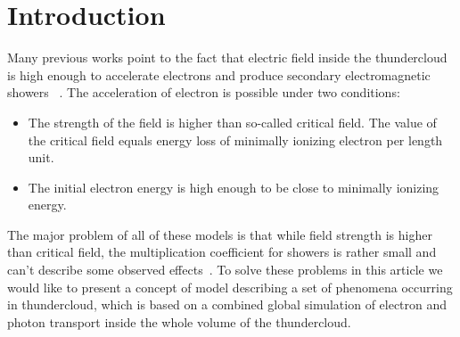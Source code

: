 \documentclass[%
 aip,
cp,  %
 amsmath,amssymb,%
 reprint,%
]{revtex4-2}
\begin{document}
\section{Introduction}
Many previous works point to the fact that electric field inside the thundercloud is high enough to accelerate electrons and produce secondary electromagnetic showers ~\cite{gurevich1992runaway, gurevich1999lightning,dwyer2003fundamental,dwyer2011low,gurevich2001kinetic, dwyer2015positron, dwyer2013properties}.
The acceleration of electron is possible under two conditions:
\begin{itemize}
    \item The strength of the field is higher than so-called critical field. The value of the critical field equals energy loss of minimally ionizing electron per length unit.
    \item The initial electron energy is high enough to be close to minimally ionizing energy.
\end{itemize}
The major problem of all of these models is that while field strength is higher than critical field, the multiplication coefficient for showers is rather small and can’t describe some observed effects~\cite{npm_dwyer, Stadnichuk}. To solve these problems in this article we would like to present a concept of model describing a set of phenomena occurring in thundercloud, which is based on a combined global simulation of electron and photon transport inside the whole volume of the thundercloud.
\end{document}
